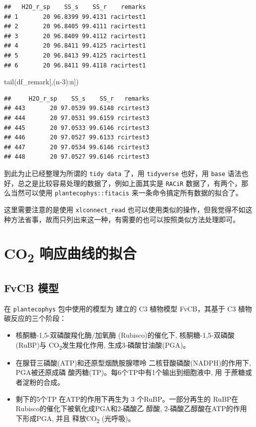 \documentclass[
]{krantz}
\makeatletter
\newenvironment{Shaded}{\begin{snugshade}}{\end{snugshade}}
\newcommand{\DecValTok}[1]{\textcolor[rgb]{0.00,0.00,0.81}{#1}}
\newcommand{\FunctionTok}[1]{\textcolor[rgb]{0.00,0.00,0.00}{#1}}
\newcommand{\NormalTok}[1]{#1}
\newcommand{\SpecialCharTok}[1]{\textcolor[rgb]{0.00,0.00,0.00}{#1}}
\newenvironment{kframe}{%
\medskip{}
\setlength{\fboxsep}{.8em}
 \def\at@end@of@kframe{}%
 \ifinner\ifhmode%
  \def\at@end@of@kframe{\end{minipage}}%
  \begin{minipage}{\columnwidth}%
 \fi\fi%
 \def\FrameCommand##1{\hskip\@totalleftmargin \hskip-\fboxsep
 \colorbox{shadecolor}{##1}\hskip-\fboxsep
     \hskip-\linewidth \hskip-\@totalleftmargin \hskip\columnwidth}%
 \MakeFramed {\advance\hsize-\width
   \@totalleftmargin\z@ \linewidth\hsize
   \@setminipage}}%
 {\par\unskip\endMakeFramed%
 \at@end@of@kframe}
\renewenvironment{Shaded}{\begin{kframe}}{\end{kframe}}
\makeatother
\begin{document}
\begin{verbatim}
##   H2O_r_sp    SS_s    SS_r    remarks
## 1       20 96.8399 99.4131 racirtest1
## 2       20 96.8405 99.4111 racirtest1
## 3       20 96.8409 99.4112 racirtest1
## 4       20 96.8411 99.4125 racirtest1
## 5       20 96.8413 99.4125 racirtest1
## 6       20 96.8411 99.4118 racirtest1
\end{verbatim}

\begin{Shaded}
\begin{Highlighting}[]
\FunctionTok{tail}\NormalTok{(df\_remark[,(n}\DecValTok{{-}3}\NormalTok{)}\SpecialCharTok{:}\NormalTok{n])}
\end{Highlighting}
\end{Shaded}

\begin{verbatim}
##     H2O_r_sp    SS_s    SS_r   remarks
## 443       20 97.0539 99.6148 rcirtest3
## 444       20 97.0531 99.6159 rcirtest3
## 445       20 97.0533 99.6146 rcirtest3
## 446       20 97.0527 99.6133 rcirtest3
## 447       20 97.0534 99.6146 rcirtest3
## 448       20 97.0527 99.6146 rcirtest3
\end{verbatim}

到此为止已经整理为所谓的 \texttt{tidy\ data} 了，用 \texttt{tidyverse} 也好，用 \texttt{base} 语法也好，总之是比较容易处理的数据了，例如上面其实是 \texttt{RACiR} 数据了，有两个，那么当然可以使用 \texttt{plantecophys::fitacis} 来一条命令搞定所有数据的拟合了。

这里需要注意的是使用 \texttt{xlconnect\_read} 也可以使用类似的操作，但我觉得不如这种方法省事，故而只列出来这一种，有需要的也可以按照类似方法处理即可。

\cleardoublepage

\hypertarget{response_fit}{%
\chapter{\texorpdfstring{CO\textsubscript{2} 响应曲线的拟合}{CO2 响应曲线的拟合}}\label{response_fit}}

\hypertarget{fvcb_mod}{%
\section{FvCB 模型}\label{fvcb_mod}}

在 \texttt{plantecophys} 包中使用的模型为 \citet{Farquhar1980A} 建立的 C3 植物模型 FvCB，其基于 C3 植物碳反应的三个阶段：

\begin{itemize}
\item
  核酮糖-1,5-双磷酸羧化酶/加氧酶 (Rubisco)的催化下, 核酮糖-1,5-双磷酸(RuBP)与 CO\textsubscript{2}发生羧化作用, 生成3-磷酸甘油酸(PGA)。
\item
  在腺苷三磷酸(ATP)和还原型烟酰胺腺嘌呤 二核苷酸磷酸(NADPH)的作用下, PGA被还原成磷 酸丙糖(TP)。每6个TP中有1个输出到细胞液中,
  用 于蔗糖或者淀粉的合成。
\item
  剩下的5个TP 在ATP的作用下再生为 3 个RuBP。一部分再生的 RuBP在Rubisco的催化下被氧化成PGA和2-磷酸乙 醇酸,
  2-磷酸乙醇酸在ATP的作用下形成PGA, 并且 释放CO\textsubscript{2} (光呼吸)。
\end{itemize}
\end{document}
